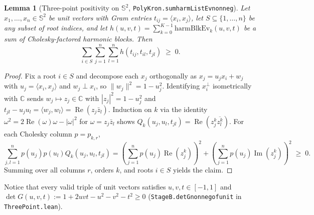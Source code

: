 \documentclass[11pt,reqno]{amsart}
\renewcommand{\_}{\origunderscore\allowbreak}
\newtheorem{lemma}[theorem]{Lemma}
\theoremstyle{definition}
\newcommand{\C}{\mathbb{C}}
\newcommand{\Sph}{\mathbb{S}^2}
\newcommand{\ip}[2]{\langle #1, #2 \rangle}
\newcommand{\norm}[1]{\lVert #1 \rVert}
\begin{document}
\begin{lemma}[Three-point positivity on $\Sph$, \texttt{PolyKron.sum\_harmListEv\_nonneg}]\label{lem:3pt-pos}
Let $x_1,\dots,x_n \in \Sph$ be unit vectors with Gram entries $t_{ij} = \ip{x_i}{x_j}$, let $S \subseteq \{1,\dots,n\}$ be any subset of root indices, and let $h(u,v,t) = \sum_{k=0}^{K-1} \mathrm{harmBlkEv}_k(u,v,t)$ be a sum of Cholesky-factored harmonic blocks. Then
\[
  \sum_{i \in S} \sum_{j=1}^n \sum_{l=1}^n h(t_{ij}, t_{il}, t_{jl}) \;\ge\; 0.
\]
\end{lemma}

\begin{proof}
Fix a root $i \in S$ and decompose each $x_j$ orthogonally as $x_j = u_j x_i + w_j$ with $u_j = \ip{x_i}{x_j}$ and $w_j \perp x_i$, so $\norm{w_j}^2 = 1 - u_j^2$. Identifying $x_i^\perp$ isometrically with $\C$ sends $w_j \mapsto z_j \in \C$ with $|z_j|^2 = 1 - u_j^2$ and $t_{jl} - u_j u_l = \ip{w_j}{w_l} = \operatorname{Re}(z_j \bar{z}_l)$. Induction on $k$ via the identity $\omega^2 = 2\operatorname{Re}(\omega)\omega - |\omega|^2$ for $\omega = z_j \bar{z}_l$ shows $Q_k(u_j, u_l, t_{jl}) = \operatorname{Re}(z_j^k \overline{z_l^k})$. For each Cholesky column $p = p_{k,r}$,
\[
  \sum_{j,l=1}^n p(u_j)p(u_l) Q_k(u_j,u_l,t_{jl})
  = \left(\sum_{j=1}^n p(u_j)\operatorname{Re}(z_j^k)\right)^2 + \left(\sum_{j=1}^n p(u_j)\operatorname{Im}(z_j^k)\right)^2 \;\ge\; 0.
\]
Summing over all columns $r$, orders $k$, and roots $i \in S$ yields the claim.
\end{proof}

Notice that every valid triple of unit vectors satisfies $u,v,t \in [-1,1]$ and $\det G(u,v,t) := 1 + 2uvt - u^2 - v^2 - t^2 \ge 0$ (\texttt{StageB.detG\_nonneg\_of\_unit} in \texttt{ThreePoint.lean}).
\end{document}
